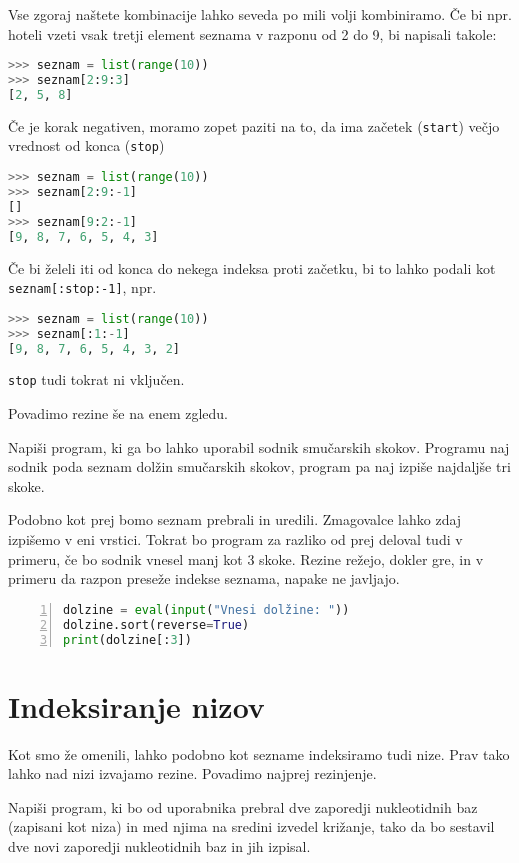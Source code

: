 Vse zgoraj naštete kombinacije lahko seveda po mili volji kombiniramo. Če bi npr. hoteli vzeti vsak tretji element seznama v razponu od 2 do 9, bi napisali takole:
\begin{lstlisting}[language=Python]
>>> seznam = list(range(10))
>>> seznam[2:9:3]
[2, 5, 8]
\end{lstlisting}
Če je korak negativen, moramo zopet paziti na to, da ima začetek (\texttt{start}) večjo vrednost od konca (\texttt{stop})
\begin{lstlisting}[language=Python]
>>> seznam = list(range(10))
>>> seznam[2:9:-1]
[]
>>> seznam[9:2:-1]
[9, 8, 7, 6, 5, 4, 3]
\end{lstlisting}
Če bi želeli iti od konca do nekega indeksa proti začetku, bi to lahko podali kot \texttt{seznam[:stop:-1]}, npr.
\begin{lstlisting}[language=Python]
>>> seznam = list(range(10))
>>> seznam[:1:-1]
[9, 8, 7, 6, 5, 4, 3, 2]
\end{lstlisting}
\texttt{stop} tudi tokrat ni vključen.

Povadimo rezine še na enem zgledu.
\begin{zgled}
Napiši program, ki ga bo lahko uporabil sodnik smučarskih skokov. Programu naj sodnik poda seznam dolžin smučarskih skokov, program pa naj izpiše najdaljše tri skoke.
\end{zgled}

\begin{resitev}
Podobno kot prej bomo seznam prebrali in uredili. Zmagovalce lahko zdaj izpišemo v eni vrstici. Tokrat bo program za razliko od prej deloval tudi v primeru, če bo sodnik vnesel manj kot 3 skoke. Rezine režejo, dokler gre, in v primeru da razpon preseže indekse seznama, napake ne javljajo.
\begin{lstlisting}[language=Python,numbers=left]
dolzine = eval(input("Vnesi dolžine: "))
dolzine.sort(reverse=True)
print(dolzine[:3])
\end{lstlisting}
\end{resitev}

\section{Indeksiranje nizov}
Kot smo že omenili, lahko podobno kot sezname indeksiramo tudi nize. Prav tako lahko nad nizi izvajamo rezine. Povadimo najprej rezinjenje.

\begin{zgled}
Napiši program, ki bo od uporabnika prebral dve zaporedji nukleotidnih baz (zapisani kot niza) in med njima na sredini izvedel križanje, tako da bo sestavil dve novi zaporedji nukleotidnih baz in jih izpisal.
\end{zgled}

